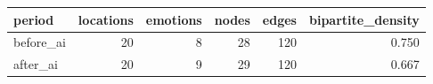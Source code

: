 \begin{tabular}{lrrrrr}
\toprule
period & locations & emotions & nodes & edges & bipartite\_density \\
\midrule
before\_ai & 20 & 8 & 28 & 120 & 0.750 \\
after\_ai & 20 & 9 & 29 & 120 & 0.667 \\
\bottomrule
\end{tabular}
